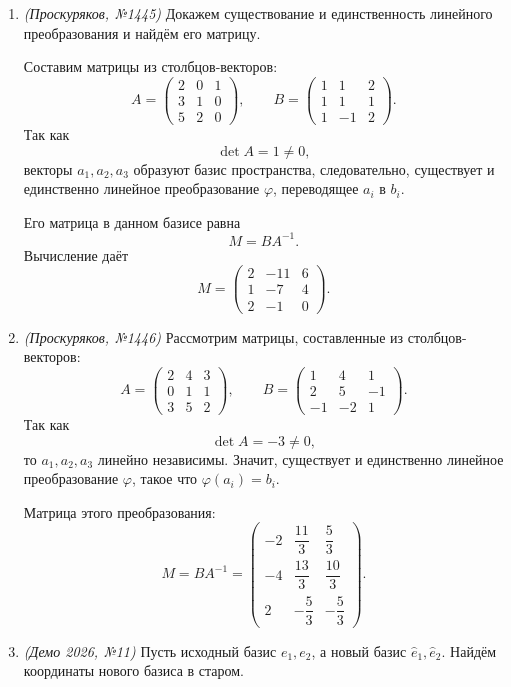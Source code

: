 \begin{enumerate}
\item \textit{(Проскуряков, №1445)}
Докажем существование и единственность линейного преобразования и найдём его матрицу.

Составим матрицы из столбцов-векторов:
\[
A=\begin{pmatrix}
2&0&1\\
3&1&0\\
5&2&0
\end{pmatrix},\qquad
B=\begin{pmatrix}
1&1&2\\
1&1&1\\
1&-1&2
\end{pmatrix}.
\]
Так как
\[
\det A=1\ne 0,
\]
векторы \(a_1,a_2,a_3\) образуют базис пространства, следовательно, существует и единственно линейное преобразование \(\varphi\), переводящее \(a_i\) в \(b_i\).

Его матрица в данном базисе равна
\[
M=BA^{-1}.
\]
Вычисление даёт
\[
M=
\begin{pmatrix}
2&-11&6\\
1&-7&4\\
2&-1&0
\end{pmatrix}.
\]

\item \textit{(Проскуряков, №1446)}
Рассмотрим матрицы, составленные из столбцов-векторов:
\[
A=\begin{pmatrix}
2&4&3\\
0&1&1\\
3&5&2
\end{pmatrix},\qquad
B=\begin{pmatrix}
1&4&1\\
2&5&-1\\
-1&-2&1
\end{pmatrix}.
\]
Так как
\[
\det A=-3\ne 0,
\]
то \(a_1,a_2,a_3\) линейно независимы. Значит, существует и единственно линейное преобразование \(\varphi\), такое что \(\varphi(a_i)=b_i\).

Матрица этого преобразования:
\[
M=BA^{-1}
=
\begin{pmatrix}
-2&\dfrac{11}{3}&\dfrac{5}{3}\\
-4&\dfrac{13}{3}&\dfrac{10}{3}\\
2&-\dfrac{5}{3}&-\dfrac{5}{3}
\end{pmatrix}.
\]

\item \textit{(Демо 2026, №11)}
Пусть исходный базис \(e_1,e_2\), а новый базис \(\hat e_1,\hat e_2\).
Найдём координаты нового базиса в старом.


\end{enumerate}
